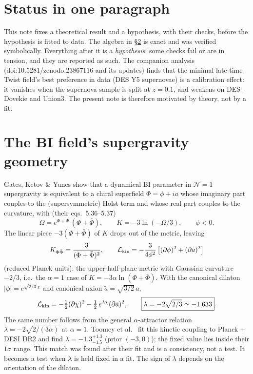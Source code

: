 \documentclass[11pt]{article}
\begin{document}
\section{Status in one paragraph}
This note fixes a theoretical result and a hypothesis, with their checks, before the hypothesis is fitted to data.
The algebra in \S\ref{sec:geometry} is exact and was verified symbolically. Everything after it is a
\emph{hypothesis}: some checks fail or are in tension, and they are reported as such. The companion analysis
(doi:10.5281/zenodo.23867116 and its updates) finds that the minimal late-time Twist field's best preference in
data (DES Y5 supernovae) is a calibration effect: it vanishes when the supernova sample is split at $z=0.1$, and
weakens on DES-Dovekie and Union3. The present note is therefore motivated by theory, not by a fit.

\section{The BI field's supergravity geometry}\label{sec:geometry}
Gates, Ketov \& Yunes \cite{gky2009} show that a dynamical BI parameter in $\mathcal N=1$ supergravity is
equivalent to a chiral superfield $\Phi=\phi+ia$ whose imaginary part couples to the (supersymmetric) Holst term and
whose real part couples to the curvature, with (their eqs.~5.36--5.37)
\begin{equation}
\Omega=e^{\Phi+\bar\Phi}\,(\Phi+\bar\Phi),\qquad K=-3\ln(-\Omega/3),\qquad \phi<0 .
\end{equation}
The linear piece $-3(\Phi+\bar\Phi)$ of $K$ drops out of the metric, leaving
\begin{equation}
K_{\Phi\bar\Phi}=\frac{3}{(\Phi+\bar\Phi)^2},\qquad
\mathcal L_{\rm kin}=-\frac{3}{4\phi^2}\left[(\partial\phi)^2+(\partial a)^2\right]
\end{equation}
(reduced Planck units): the upper-half-plane metric with Gaussian curvature $-2/3$, i.e.\ the $\alpha=1$ case of
$K=-3\alpha\ln(\Phi+\bar\Phi)$. With the canonical dilaton $|\phi|=e^{\sqrt{2/3}\,\chi}$ and canonical axion
$\tilde a=\sqrt{3/2}\,a$,
\begin{equation}
\mathcal L_{\rm kin}=-\tfrac12(\partial\chi)^2-\tfrac12\,e^{\lambda\chi}(\partial\tilde a)^2,\qquad
\boxed{\lambda=-2\sqrt{2/3}\simeq-1.633}.
\end{equation}
The same number follows from the general $\alpha$-attractor relation $\lambda=-2\sqrt{2/(3\alpha)}$
\cite{qalpha2026} at $\alpha=1$. Toomey et al.\ \cite{toomey2025} fit this kinetic coupling to Planck + DESI DR2
and find $\lambda=-1.3^{+1.3}_{-1.5}$ (prior $(-3,0)$); the fixed value lies inside their $1\sigma$ range. This match
was found after their fit and is a consistency, not a test. It becomes a test when $\lambda$ is held fixed in a fit.
The sign of $\lambda$ depends on the orientation of the dilaton.
\end{document}
